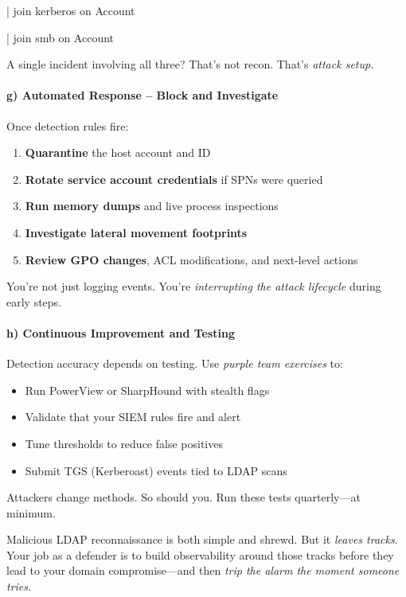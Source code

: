 {{| join kerberos on Account

| join smb on Account

A single incident involving all three? That’s not recon. That’s \textit{attack setup.}

\paragraph{\textbf{g) Automated Response – Block and Investigate}}

Once detection rules fire:

\begin{enumerate}
    \item \textbf{Quarantine} the host account and ID
    \item \textbf{Rotate service account credentials} if SPNs were queried
    \item \textbf{Run memory dumps} and live process inspections
    \item \textbf{Investigate lateral movement footprints}
    \item \textbf{Review GPO changes}, ACL modifications, and next-level actions

\end{enumerate}
You’re not just logging events. You’re \textit{interrupting the attack lifecycle} during early steps.

\paragraph{\textbf{h) Continuous Improvement and Testing}}

Detection accuracy depends on testing. Use \textit{purple team exercises} to:

\begin{itemize}
    \item Run PowerView or SharpHound with stealth flags
    \item Validate that your SIEM rules fire and alert
    \item Tune thresholds to reduce false positives
    \item Submit TGS (Kerberoast) events tied to LDAP scans

\end{itemize}
Attackers change methods. So should you. Run these tests quarterly—at minimum.

Malicious LDAP reconnaissance is both simple and shrewd. But it \textit{leaves tracks}. Your job as a defender is to build observability around those tracks before they lead to your domain compromise—and then \textit{trip the alarm the moment someone tries.}

}}
